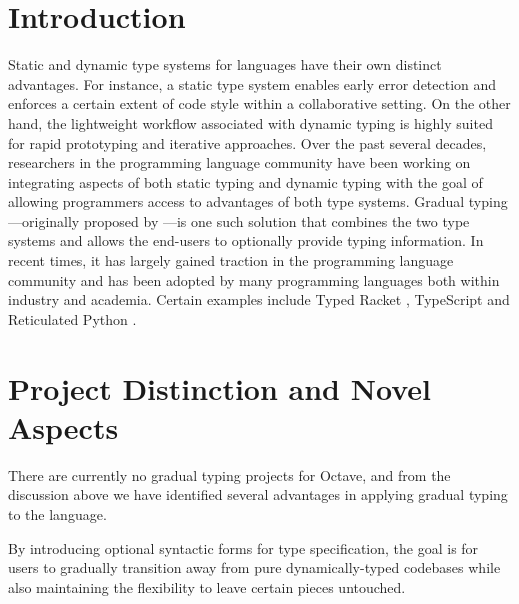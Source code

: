 \newcommand{\fig}[2]{\texttt{[image: \#2]}}
\newcommand{\centerfig}[2]{\begin{center}
\color{black} \texttt{[image: \#2]}\end{center}}
\newcommand \bnfdef  {\mathrel{::=}}
\newcommand \bnfalt  {\mathrel{|}}
\newcommand \tc[3]{{#1} \vdash {#2} : {#3}}

\section{Introduction}
Static and dynamic type systems for languages have their own distinct advantages. For instance, a static type system enables early error detection and enforces a certain extent of code style within a collaborative setting. On the other hand, the lightweight workflow associated with dynamic typing is highly suited for rapid prototyping and iterative approaches. Over the past several decades, researchers in the programming language community have been working on integrating aspects of both static typing and dynamic typing with the goal of allowing programmers access to advantages of both type systems. Gradual typing---originally proposed by \citet{siek2006gradual}---is one such solution that combines the two type systems and allows the end-users to optionally provide typing information. In recent times, it has largely gained traction in the programming language community and has been adopted by many programming languages both within industry and academia. Certain examples include Typed Racket \cite{tobin2006interlanguage}, TypeScript \cite{bierman2014understanding} and Reticulated Python \cite{vitousek2014design}.

\section{Project Distinction and Novel Aspects}
There are currently no gradual typing projects for Octave, and from the discussion above we have identified several advantages in applying gradual typing to the language.

By introducing optional syntactic forms for type specification, the goal is for users to gradually transition away from pure dynamically-typed codebases while also maintaining the flexibility to leave certain pieces untouched.

